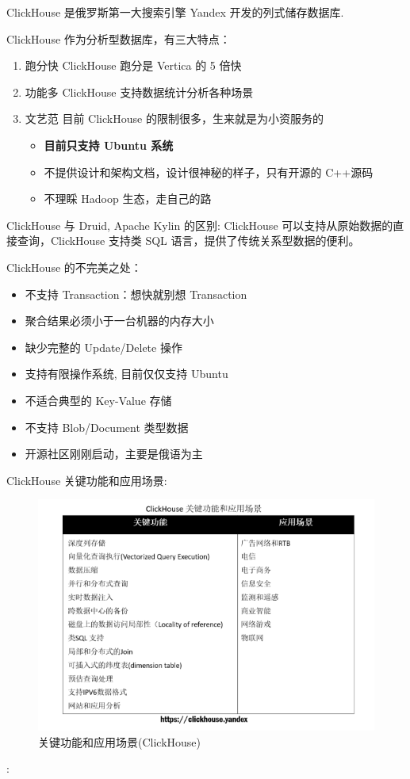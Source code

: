 \documentclass[hyperref, UTF-8]{ctexart}
\begin{document}
ClickHouse 是俄罗斯第一大搜索引擎 Yandex 开发的列式储存数据库. 


ClickHouse 作为分析型数据库，有三大特点：
\begin{enumerate}
\item 跑分快
ClickHouse 跑分是 Vertica 的 5 倍快
\item 功能多
ClickHouse 支持数据统计分析各种场景
\item 文艺范
目前 ClickHouse 的限制很多，生来就是为小资服务的  
\begin{itemize}
\item \textbf{目前只支持 Ubuntu 系统}
\item 不提供设计和架构文档，设计很神秘的样子，只有开源的 C++源码
\item 不理睬 Hadoop 生态，走自己的路
\end{itemize}
\end{enumerate}

ClickHouse 与 Druid, Apache Kylin 的区别: ClickHouse 可以支持从原始数据的直接查询，ClickHouse 支持类 SQL 语言，提供了传统关系型数据的便利。 

ClickHouse 的不完美之处：
\begin{itemize}
\item 不支持 Transaction：想快就别想 Transaction
\item 聚合结果必须小于一台机器的内存大小
\item 缺少完整的 Update/Delete 操作
\item 支持有限操作系统, 目前仅仅支持 Ubuntu
\item 不适合典型的 Key-Value 存储
\item 不支持 Blob/Document 类型数据
\item 开源社区刚刚启动，主要是俄语为主
\end{itemize}

ClickHouse 关键功能和应用场景:

\begin{figure}[htbp]
\centering
\includegraphics[width=.9\linewidth]{ClickHouse/4410782-be7ecc1aa19372d6_2017-11-30_10-14-41.png}
\caption{关键功能和应用场景(ClickHouse)}
\end{figure}:
\end{document}
